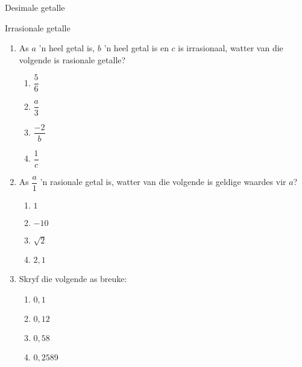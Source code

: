 \begin{Aktiwiteit}{Desimale getalle}
\begin{aktiwiteit}{Irrasionale getalle}
\begin{exercises}{}{
\begin{enumerate}[itemsep=5pt, label=\textbf{\arabic*}. ] 
\item As $a$ 'n heel getal is, $b$ 'n heel getal is en $c$ is irrasionaal, watter van die volgende is rasionale getalle? 
  \begin{enumerate}[itemsep=5pt, label=\textbf{\alph*}. ] 
    \item $\dfrac{5}{6}$
    \item $\dfrac{a}{3}$
    \item $\dfrac{-2}{b}$
    \item $\dfrac{1}{c}$
    \end{enumerate}
\item As $\dfrac{a}{1}$ 'n rasionale getal is, watter van die volgende is geldige waardes vir $a$?
    \begin{enumerate}[itemsep=5pt, label=\textbf{\alph*}. ] 
    \item $1$
    \item $-10$
    \item $\sqrt{2}$
    \item $2,1$
    \end{enumerate}
% 
\item Skryf die volgende as breuke:
    \begin{enumerate}[itemsep=5pt, label=\textbf{\alph*}. ] 
    \item $0,1$
    \item $0,12$
    \item $0,58$
    \item $0,2589$
    \end{enumerate}

\end{enumerate}}
\end{exercises}
\end{aktiwiteit}
\end{Aktiwiteit}
